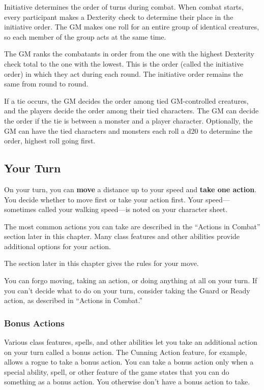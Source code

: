Initiative determines the order of turns during combat. When combat starts, every participant makes a Dexterity check to determine their place in the initiative order. The GM makes one roll for an entire group of identical creatures, so each member of the group acts at the same time.

The GM ranks the combatants in order from the one with the highest Dexterity check total to the one with the lowest. This is the order (called the initiative order) in which they act during each round. The initiative order remains the same from round to round.

If a tie occurs, the GM decides the order among tied GM-controlled creatures, and the players decide the order among their tied characters. The GM can decide the order if the tie is between a monster and a player character. Optionally, the GM can have the tied characters and monsters each roll a d20 to determine the order, highest roll going first.

\subsection{Your Turn}

On your turn, you can \textbf{move} a distance up to your speed and \textbf{take one action}. You decide whether to move first or take your action first. Your speed— sometimes called your walking speed—is noted on your character sheet.

The most common actions you can take are described in the “Actions in Combat” section later in this chapter. Many class features and other abilities provide additional options for your action.

The  section later in this chapter gives the rules for your move.

You can forgo moving, taking an action, or doing anything at all on your turn. If you can't decide what to do on your turn, consider taking the Guard or Ready action, as described in “Actions in Combat.”

\subsubsection{Bonus Actions}

Various class features, spells, and other abilities let you take an additional action on your turn called a bonus action. The Cunning Action feature, for example, allows a rogue to take a bonus action. You can take a bonus action only when a special ability, spell, or other feature of the game states that you can do something as a bonus action. You otherwise don't have a bonus action to take.

